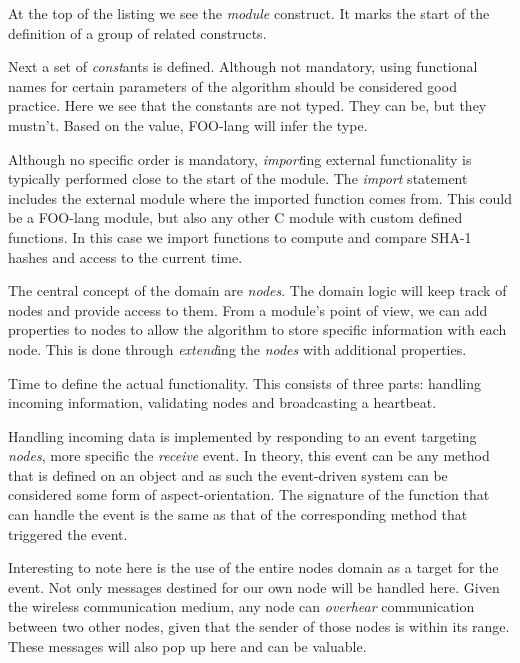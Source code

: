 \documentclass[conference]{IEEEtran}
\begin{document}
At the top of the listing we see the \emph{module} construct. It marks the
start of the definition of a group of related constructs.

Next a set of \emph{const}ants is defined. Although not mandatory, using
functional names for certain parameters of the algorithm should be considered
good practice. Here we see that the constants are not typed. They can be, but
they mustn't. Based on the value, FOO-lang will infer the type.

Although no specific order is mandatory, \emph{import}ing external
functionality is typically performed close to the start of the module. The
\emph{import} statement includes the external module where the imported
function comes from. This could be a FOO-lang module, but also any other C
module with custom defined functions. In this case we import functions to
compute and compare SHA-1 hashes and access to the current time.

The central concept of the domain are \emph{nodes}. The domain logic will keep
track of nodes and provide access to them. From a module's point of view, we
can add properties to nodes to allow the algorithm to store specific
information with each node. This is done through \emph{extend}ing the
\emph{nodes} with additional properties.

Time to define the actual functionality. This consists of three parts: handling
incoming information, validating nodes and broadcasting a heartbeat.

Handling incoming data is implemented by responding to an event targeting
\emph{nodes}, more specific the \emph{receive} event. In theory, this event can
be any method that is defined on an object and as such the event-driven system
can be considered some form of aspect-orientation. The signature of the
function that can handle the event is the same as that of the corresponding
method that triggered the event.

Interesting to note here is the use of the entire nodes domain as a target for
the event. Not only messages destined for our own node will be handled here.
Given the wireless communication medium, any node can \emph{overhear}
communication between two other nodes, given that the sender of those nodes is
within its range. These messages will also pop up here and can be valuable.
\end{document}
